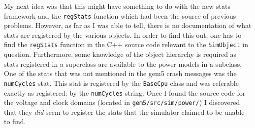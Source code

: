     My next idea was that this might have something to do with the new stats 
    framework and the \texttt{regStats} function which had been the source of 
    previous problems. However, as far as I was able to tell, there is no 
    documentation of what stats are registered by the various objects. In order 
    to find this out, one has to find the \texttt{regStats} function in the C++ 
    source code relevant to the \texttt{SimObject} in question. Furthermore, 
    some knowledge of the object hierarchy is required as stats registered in a 
    superclass are available to the power models in a subclass. One of the stats
    that was not mentioned in the gem5 crash messages was the \texttt{numCycles}
    stat. This stat is registered by the \texttt{BaseCpu} class and was
    referable exactly as registered: by the \texttt{numCycles} string. Once I
    found the source code for the voltage and clock domains (located in 
    \texttt{gem5/src/sim/power/}) I discovered that they \textit{did} seem to 
    register the stats that the simulator claimed to be unable to find.
